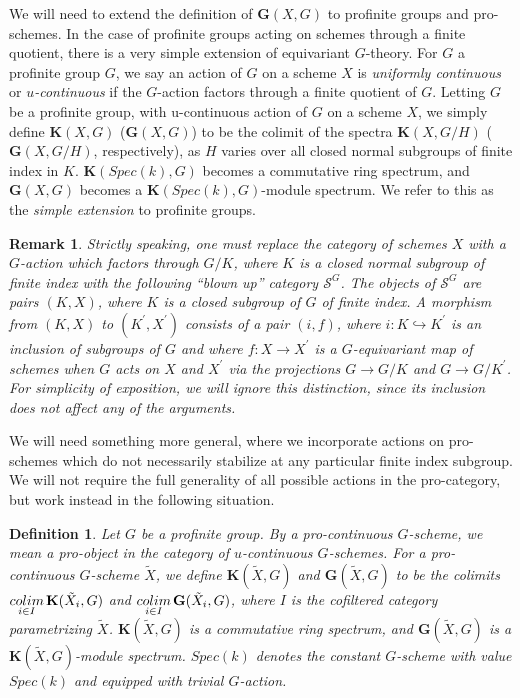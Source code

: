 \documentclass[11pt]{article}
\newcommand\mc{\mathcal}
\def \bK{\mathbf K}
\newcommand\mfk{\mathbf G}
\newtheorem{Definition}{Definition}[section]
\newtheorem{Remark}{Remark}[section]
\begin{document}
We will need to extend the definition of $\mfk(X, G)$ to  profinite groups and pro-schemes.  In the case of profinite groups acting on schemes through a finite quotient, there is a very simple extension of equivariant $G$-theory. For $G$ a profinite group $G$, we say an action of $G$ on a scheme $X$ is {\em uniformly continuous} or {\em $u$-continuous} if the $G$-action factors through a finite quotient of $G$.  Letting $G$ be a profinite group, with u-continuous  action of $G$ on a scheme $X$, we simply define $\bK(X, G)$ ($\mfk(X, G)$) to be the colimit of the spectra $\bK(X, G/H)$ ($\mfk(X, G/H)$, respectively), as $H$ varies over all closed normal subgroups of finite index in $K$.  $\bK(Spec(k), G)$ becomes a commutative ring spectrum, and $\mfk(X, G)$ becomes a $\bK(Spec(k), G)$-module spectrum.  We refer to this as the {\em simple extension} to profinite groups. 
\begin{Remark}
    Strictly speaking,  one must replace the category of schemes $X$ with a $G$-action which factors through $G/K$, where $K$ is a closed normal subgroup of finite index with the following ``blown up'' category $\mc{S}^G$.  The objects of $\mc{S}^G$ are pairs  $(K,X)$, where $K$ is a closed subgroup of $G$ of finite index.  A   morphism from $(K,X) $ to $(K^{\prime},X^{\prime}) $ consists of a pair $(i,f)$, where $i : K \hookrightarrow K^{\prime}$ is an inclusion of subgroups of $G$ and where $f: X \rightarrow X^{\prime}$ is a $G$-equivariant map of schemes when $G$ acts on $X$ and $X^{\prime}$ via the projections $G \rightarrow G/K$ and $G \rightarrow G/K^{\prime}$. For simplicity of exposition, we will ignore this distinction, since its inclusion does not affect any of the arguments.    
\end{Remark}
We will need something more general, where we incorporate actions on pro-schemes which do not necessarily stabilize at any particular finite index subgroup.   We will  not require the full generality of all possible actions in the pro-category, but work instead in the following situation.  
\begin{Definition} \label{procontinuous}
    Let $G$ be a profinite group.  By a {\em pro-continuous $G$-scheme}, we mean a pro-object in the category of $u$-continuous $G$-schemes.   For a pro-continuous $G$-scheme $\tilde{X}$,  we define $\bK(\tilde{X},G)$ and $\mfk(\tilde{X}, G)$ to be the colimits $\underset{i \in I}{colim} \hspace{.05cm} \bK(\tilde{X}_i,G) $ and $\underset{i \in I}{colim}  \hspace{.05cm} \mfk(\tilde{X}_i,G) $, where $I$ is the cofiltered category parametrizing $\tilde{X}$.  $\bK(\tilde{X},G)$ is a commutative ring spectrum, and $\mfk(\tilde{X},G)$ is a $\bK(\tilde{X},G)$-module spectrum.  $Spec (k)$ denotes the constant $G$-scheme with value $Spec(k)$ and equipped with trivial $G$-action.  
\end{Definition}
\end{document}
